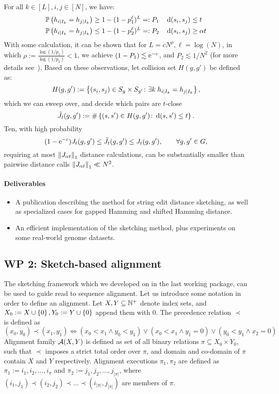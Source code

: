 For all $k\in[L],i,j\in[N]$, we have:
\begin{align*}
&\mathbb{P}\left( h_{i|I_k}= h_{j|I_k} \right)\ge 1-(1-p_1^\ell)^L=:P_1 &&\operatorname{\mathrm{d}}(s_i,s_j)\le t  \\
&\mathbb{P}\left( h_{i|I_k}= h_{j|I_k} \right)\le 1-(1-p_2^\ell)^L=:P_2 &&\operatorname{\mathrm{d}}(s_i,s_j)\ge \alpha t 
\end{align*}
With some calculation, it can be shown that for $L=c N^\rho, \ell=\log(N)$, in which $\rho:=\frac{\log(1/p_1)}{\log(1/p_2)}<1$, we achieve $(1-P_1)\lesssim \text{e}^{-c}$, and $P_2\lesssim 1/N^2$ (for more details see~\cite{datar2004locality}).
Based on these observations, let collision set $H(g,g')$ be defined as:
\[
H(g,g'):=\left\{(s_i,s_j)\in S_g\times S_{g'}\colon \exists k\; h_{i|I_k}= h_{j|I_k}\right\},
\]
which we can sweep over, and decide which pairs are $t$-close 
\[
\tilde{J}_t(g,g'):=\# \left\{(s,s')\in H(g,g')\colon \operatorname{\mathrm{d}}(s,s')\le t \right\}.
\]
Ten, with high probability
\[
(1-\text{e}^{-c}) J_t (g,g') \le \tilde{J}_t(g,g') \le J_t (g,g'), \qquad \forall g,g'\in G,
\]
requiring at most $\left\lVert J_{\alpha t}\right\rVert_1$ distance calculations, can be substantially smaller than pairwise distance calls $\left\lVert J_{\alpha t}\right\rVert_1\ll N^2$. 



\paragraph{Deliverables}
\begin{itemize}
\item A publication describing the method for string edit distance sketching, as well as specialized cases for gapped Hamming and shifted Hamming distance. 
\item An efficient implementation of the sketching method, plus experiments on some real-world genome datasets.
\end{itemize}

\newcommand{\AlgG}{\mathcal{A}_G}
\newcommand{\AlgL}{\mathcal{A}_L}
\newcommand{\AlgLG}{\mathcal{A}_{LG}}
\newcommand{\AlgGL}{\mathcal{A}_{GL}}

\subsection{WP 2: Sketch-based alignment}
The sketching framework which we developed on in the last working package, can be used to guide read to sequence alignment. Let us introduce some notation in order to define an alignment. Let $X,Y\subseteq \mathbb{N}^{+}$ denote index sets, and $X_0:=X\cup\left\{0\right\}, Y_0:=Y\cup\left\{0\right\}$ append them with $0$. The precedence relation $\prec$ is defined as 
\[
(x_0,y_0)\prec(x_1,y_1) \iff ( x_0<x_1\wedge y_0<y_1) \vee (x_0<x_1 \wedge y_1=0) \vee (y_0<y_1 \wedge x_2=0)
\]
Alignment family $\mathcal{A}(X,Y)$ is defined as set of all binary relations $\pi\subseteq X_0\times Y_0$, such that $\prec$ imposes a strict total order over $\pi$, and domain and co-domain of $\pi$ contain $X$ and $Y$ respectively. Alignment executions $\pi_1,\pi_2$ are defined as $\pi_1:=i_1,i_2,\dots,i_{\pi}$ and $\pi_2:=j_1,j_2,\dots,j_{|\pi|}$, where $(i_1,j_1)\prec (i_2,j_2)\prec \dots \prec (i_{|\pi|},j_{|\pi|})$ are members of $\pi$. 

